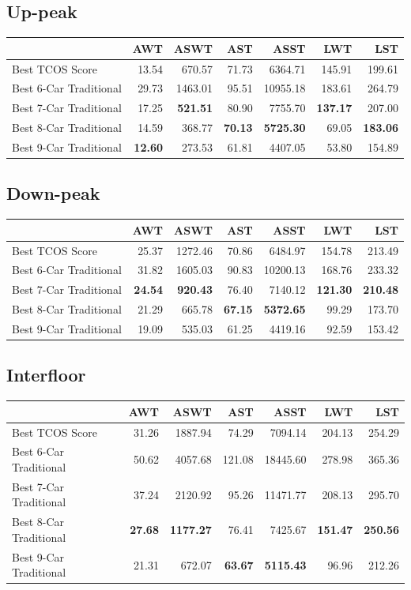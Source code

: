 \documentclass{UoYCSproject}
\begin{document}
\subsection{Up-peak}
\begin{tabular}{l | r r r r r r}
    & AWT & ASWT & AST & ASST & LWT & LST \\
	\hline
    Best TCOS Score & 13.54 & 670.57 & 71.73 & 6364.71 & 145.91 & 199.61 \\
	\hline
    Best 6-Car Traditional & 29.73 & 1463.01 & 95.51 & 10955.18 & 183.61 & 264.79 \\
    Best 7-Car Traditional & 17.25 & \textbf{521.51} & 80.90 & 7755.70 & \textbf{137.17} & 207.00 \\
    Best 8-Car Traditional & 14.59 & 368.77 & \textbf{70.13} & \textbf{5725.30} & 69.05 & \textbf{183.06} \\
    Best 9-Car Traditional & \textbf{12.60} & 273.53 & 61.81 & 4407.05 & 53.80 & 154.89
\end{tabular}

\subsection{Down-peak}
\begin{tabular}{l | r r r r r r}
    & AWT & ASWT & AST & ASST & LWT & LST \\
	\hline
    Best TCOS Score & 25.37 & 1272.46 & 70.86 & 6484.97 & 154.78 & 213.49 \\
	\hline
    Best 6-Car Traditional & 31.82 & 1605.03 & 90.83 & 10200.13 & 168.76 & 233.32 \\
    Best 7-Car Traditional & \textbf{24.54} & \textbf{920.43} & 76.40 & 7140.12 & \textbf{121.30} & \textbf{210.48} \\
    Best 8-Car Traditional & 21.29 & 665.78 & \textbf{67.15} & \textbf{5372.65} & 99.29 & 173.70 \\
    Best 9-Car Traditional & 19.09 & 535.03 & 61.25 & 4419.16 & 92.59 & 153.42
\end{tabular}

\subsection{Interfloor}
\begin{tabular}{l | r r r r r r}
    & AWT & ASWT & AST & ASST & LWT & LST \\
	\hline
    Best TCOS Score & 31.26 & 1887.94 & 74.29 & 7094.14 & 204.13 & 254.29 \\
	\hline
    Best 6-Car Traditional & 50.62 & 4057.68 & 121.08 & 18445.60 & 278.98 & 365.36 \\
    Best 7-Car Traditional & 37.24 & 2120.92 & 95.26 & 11471.77 & 208.13 & 295.70 \\
    Best 8-Car Traditional & \textbf{27.68} & \textbf{1177.27} & 76.41 & 7425.67 & \textbf{151.47} & \textbf{250.56} \\
    Best 9-Car Traditional & 21.31 & 672.07 & \textbf{63.67} & \textbf{5115.43} & 96.96 & 212.26
\end{tabular}
\end{document}
